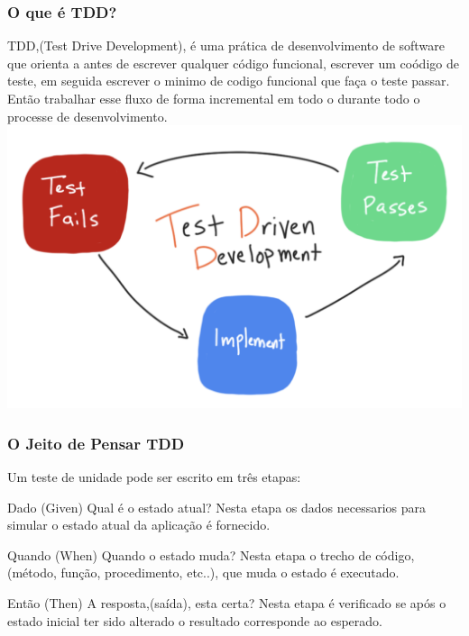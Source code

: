 \documentclass{beamer}
\begin{document}
\begin{frame}
\frametitle{O que é TDD?}
TDD,(Test Drive Development), é uma prática de desenvolvimento de software que orienta a antes de escrever qualquer código funcional, escrever um coódigo de teste, em seguida escrever o minimo de codigo funcional que faça o teste passar. Então trabalhar esse fluxo de forma incremental em todo o durante todo o processe de desenvolvimento.
\includegraphics[scale=0.15]{tdd_diagram_flow}
 
\end{frame}

\begin{frame}
	\frametitle{O Jeito de Pensar TDD}
	Um teste de unidade pode ser escrito em três etapas:
	\begin{block}{Dado (Given)}
		Qual é o estado atual? Nesta etapa os dados necessarios para simular o estado atual da aplicação é fornecido.
	\end{block}
	
	\begin{block}{Quando (When)}
		Quando o estado muda? Nesta etapa o trecho de código, (método, função, procedimento, etc..), que muda o estado é executado.
	\end{block}
	
	\begin{block}{Então (Then)}
		A resposta,(saída), esta certa? Nesta etapa é verificado se após o estado inicial ter sido alterado o resultado corresponde ao esperado.
	\end{block}
	
\end{frame}
\end{document}
